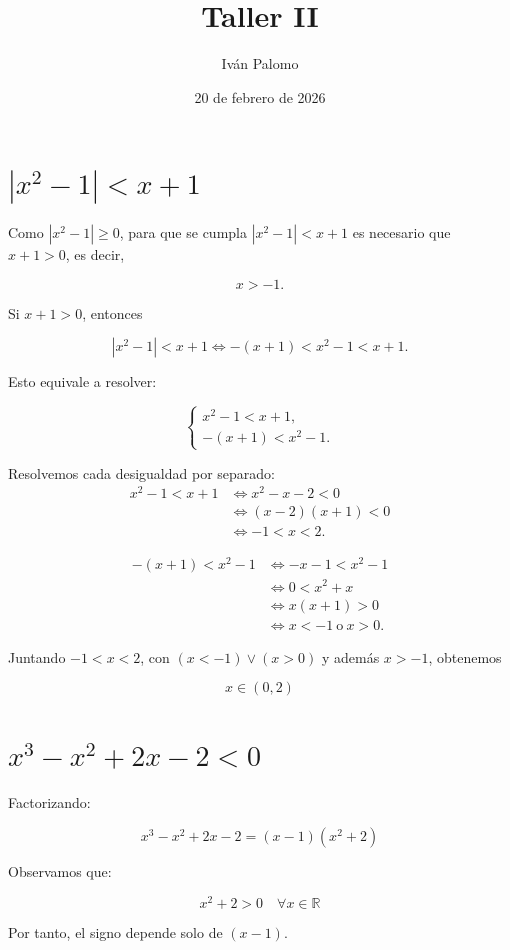 \documentclass{article}
\title{Taller II}
\author{Iván Palomo}
\date{20 de febrero de 2026}
\begin{document}
	\maketitle
	\tableofcontents
	\newpage
	
	\section{$|x^2-1|<x+1$}
	
	
	
	\medskip
	Como $|x^2-1|\ge 0$, para que se cumpla
	$|x^2-1|<x+1$ es necesario que $x+1>0$, es decir,
	
	$$
	x>-1.
	$$
	
	Si $x+1>0$, entonces
	
	
	$$|x^2-1|<x+1 \iff -(x+1)<x^2-1<x+1.$$
	
	
	Esto equivale a resolver:
	
	$$
	\begin{cases}
		x^2-1<x+1,\\
		-(x+1)<x^2-1.
	\end{cases}
	$$
	
	Resolvemos cada desigualdad por separado:
	\begin{align*}
		x^2-1<x+1
		&\iff x^2-x-2<0\\
		&\iff (x-2)(x+1)<0\\
		&\iff -1<x<2.
	\end{align*}
	
	\begin{align*}
		-(x+1)<x^2-1
		&\iff -x-1<x^2-1\\
		&\iff 0<x^2+x\\
		&\iff x(x+1)>0\\
		&\iff x<-1 \ \text{o}\ x>0.
	\end{align*}
	
	Juntando $-1<x<2$, con $(x<-1)\lor(x>0)$ y además $x>-1$, obtenemos
	
	
	$$
	\boxed{ x\in(0,2)}
	$$
	
	
	\section{$x^3-x^2+2x-2<0$}
	
	Factorizando:
	
	$$
	x^3-x^2+2x-2 =(x-1)(x^2+2)
	$$
	
	Observamos que:
	
	$$
	x^2+2>0 \quad \forall x\in\mathbb{R}
	$$
	
	Por tanto, el signo depende solo de $(x-1)$.
	
\end{document}
